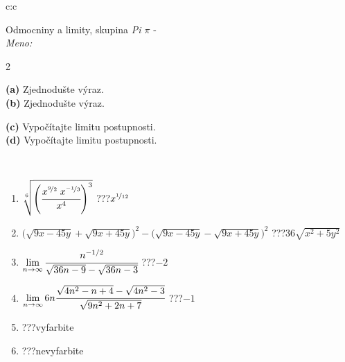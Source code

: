 \documentclass[10pt]{report}
\begin{document}
\begin{tabular}{c:c}
\begin{minipage}[c][104.5mm][t]{0.5\linewidth}
\begin{center}
\vspace{7mm}
{\huge Odmocniny a limity, skupina \textit{Pi $\pi$} -}\\[5mm]
\textit{Meno:}\phantom{xxxxxxxxxxxxxxxxxxxxxxxxxxxxxxxxxxxxxxxxxxxxxxxxxxxxxxxxxxxxxxxxx}\\[5mm]
\begin{minipage}{0.95\linewidth}
\begin{center}
{\small \begin{multicols}{2} \raggedright
\textbf{(a)} Zjednodušte výraz. \\[1mm]
\textbf{(b)} Zjednodušte výraz. \par \columnbreak
\textbf{(c)} Vypočítajte limitu postupnosti. \\[1mm]
\textbf{(d)} Vypočítajte limitu postupnosti.
\end{multicols}
}
\end{center}
\end{minipage}
\\[4mm]
\begin{minipage}{0.79\linewidth}
\begin{center}
\begin{varwidth}{\linewidth}
\begin{enumerate}
\small
\item $\sqrt[6]{\left(\cfrac{x^{\nicefrac{9}{2}}\;x^{\nicefrac{-1}{3}}}{x^{4}}\right)^{3}}$\quad \dotfill\; ???\;\dotfill \quad $x^{\nicefrac{1}{12}}$
\item {\footnotesize{\scriptsize$\big(\sqrt{9x-45y}+\sqrt{9x+45y}\big)^2-\big(\sqrt{9x-45y}-\sqrt{9x+45y}\big)^2$}\quad \dotfill\; ???\;\dotfill \quad $36\sqrt{x^2+5y^2}$}
\item $\lim\limits_{n\to\infty}\cfrac{n^{-1/2}}{\sqrt{36n-9}-\sqrt{36n-3}}$\quad \dotfill\; ???\;\dotfill \quad $-2$
\item $\lim\limits_{n\to\infty}6n\cfrac{\sqrt{4n^2-n+4}-\sqrt{4n^2-3}}{\sqrt{9n^2+2n+7}}$\quad \dotfill\; ???\;\dotfill \quad $-1$
\item \quad \dotfill\; ???\;\dotfill \quad vyfarbite
\item \quad \dotfill\; ???\;\dotfill \quad nevyfarbite
\end{enumerate}
\end{varwidth}
\end{center}
\end{minipage}

\end{center}
\end{minipage}
\end{tabular}
\end{document}

